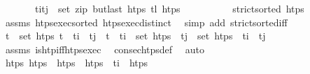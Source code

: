\begin{isabellebody}
\ \ \ \ \ \ \ {\isachardoublequoteopen}{\isacharparenleft}{\kern0pt}t\isactrlsub i{\isacharcomma}{\kern0pt}t\isactrlsub j{\isacharparenright}{\kern0pt}\ {\isasymin}\ set\ {\isacharparenleft}{\kern0pt}zip\ {\isacharparenleft}{\kern0pt}butlast\ htps{\isacharparenright}{\kern0pt}\ {\isacharparenleft}{\kern0pt}tl\ htps{\isacharparenright}{\kern0pt}{\isacharparenright}{\kern0pt}{\isachardoublequoteclose}\isanewline
%
\isadelimproof
\ \ %
\endisadelimproof
%
\isatagproof
{}\isamarkupfalse%
\ {\isacharminus}{\kern0pt}\isanewline
\ \ \ \ \isamarkupfalse%
\ {\isachardoublequoteopen}strict{\isacharunderscore}{\kern0pt}sorted\ htps{\isachardoublequoteclose}\isanewline
\ \ \ \ \ \ \isamarkupfalse%
\ assms\ htps{\isacharunderscore}{\kern0pt}exec{\isacharunderscore}{\kern0pt}sorted\ htps{\isacharunderscore}{\kern0pt}exec{\isacharunderscore}{\kern0pt}distinct\ \isamarkupfalse%
\ {\isacharparenleft}{\kern0pt}simp\ add{\isacharcolon}{\kern0pt}\ strict{\isacharunderscore}{\kern0pt}sorted{\isacharunderscore}{\kern0pt}iff{\isacharparenright}{\kern0pt}\isanewline
\ \ \ \ \isamarkupfalse%
\ {\isachardoublequoteopen}{\isasymforall}t\ {\isasymin}\ set\ htps{\isachardot}{\kern0pt}\ t\ {\isasymle}\ t\isactrlsub i\ {\isasymor}\ t\isactrlsub j\ {\isasymle}\ t{\isachardoublequoteclose}\ \ {\isachardoublequoteopen}t\isactrlsub i\ {\isasymin}\ set\ htps{\isachardoublequoteclose}\ \ {\isachardoublequoteopen}t\isactrlsub j\ {\isasymin}\ set\ htps{\isachardoublequoteclose}\ \ {\isachardoublequoteopen}t\isactrlsub i\ {\isacharless}{\kern0pt}\ t\isactrlsub j{\isachardoublequoteclose}\isanewline
\ \ \ \ \ \ \isamarkupfalse%
\ assms\ is{\isacharunderscore}{\kern0pt}htp{\isacharunderscore}{\kern0pt}iff{\isacharunderscore}{\kern0pt}htps{\isacharunderscore}{\kern0pt}exec\ \isamarkupfalse%
\ consec{\isacharunderscore}{\kern0pt}htps{\isacharunderscore}{\kern0pt}def\ \isamarkupfalse%
\ auto\isanewline
\ \ \ \ \isamarkupfalse%
\ \isamarkupfalse%
\ htps\ htps\ \ {\isachardoublequoteopen}htps\ {\isacharequal}{\kern0pt}\ htps\ {\isacharat}{\kern0pt}\ t\isactrlsub i\ {\isacharhash}{\kern0pt}\ htps\isanewline
\ \ \ \ \ \ \isamarkupfalse%

\end{isabellebody}

